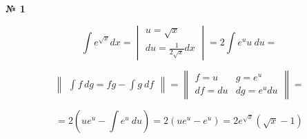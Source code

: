 \documentclass{article}
\begin{document}
\textbf{№ 1} 

$$ \int e^{\sqrt{x}} dx 
 = \begin{vmatrix}  u  = \sqrt{x} \\ 
                    du = \frac{1}{2\sqrt{x}} dx \end{vmatrix}
= 2 \int e^{u} u \ du
= $$

$$ \begin{Vmatrix} \int f \,dg = fg - \int g \ df \end{Vmatrix} =
   \begin{Vmatrix} f = u &  g = e^{u} \\
                  df = du  & dg = e^{u} du \end{Vmatrix} = $$

$$ = 2 \left( ue^{u} - \int e^{u} \ du \right)
= 2 \left( ue^{u} - e^{u} \right)
= 2 e^{\sqrt{x}}\left( \sqrt{x} - 1 \right) $$
\end{document}
